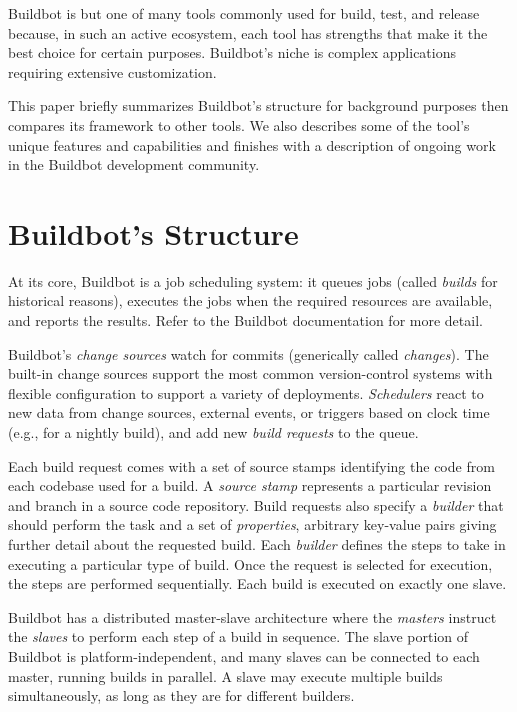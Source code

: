 \documentclass[conference]{IEEEtran}
\begin{document}
Buildbot is but one of many tools commonly used for build, test, and release because, in such an active ecosystem, each tool has strengths that make it the best choice for certain purposes.
Buildbot's niche is complex applications requiring extensive customization.

This paper briefly summarizes Buildbot's structure for background purposes then compares its framework to other tools.
We also describes some of the tool's unique features and capabilities and finishes with a description of ongoing work in the Buildbot development community.

\section{Buildbot's Structure}

At its core, Buildbot is a job scheduling system: it queues jobs (called \emph{builds} for historical reasons), executes the jobs when the required resources are available, and reports the results.
Refer to the Buildbot documentation\cite{bb-introduction} for more detail.

Buildbot's \emph{change sources} watch for commits (generically called \emph{changes}).
The built-in change sources support the most common version-control systems with flexible configuration to support a variety of deployments.
\emph{Schedulers} react to new data from change sources, external events, or triggers based on clock time (e.g., for a nightly build), and add new \emph{build requests} to the queue.

Each build request comes with a set of source stamps identifying the code from each codebase used for a build.
A \emph{source stamp} represents a particular revision and branch in a source code repository.
Build requests also specify a \emph{builder} that should perform the task and a set of \emph{properties}, arbitrary key-value pairs giving further detail about the requested build.
Each \emph{builder} defines the steps to take in executing a particular type of build.
Once the request is selected for execution, the steps are performed sequentially.
Each build is executed on exactly one slave.

Buildbot has a distributed master-slave architecture where the \emph{masters} instruct the \emph{slaves} to perform each step of a build in sequence.
The slave portion of Buildbot is platform-independent, and many slaves can be connected to each master, running builds in parallel.
A slave may execute multiple builds simultaneously, as long as they are for different builders.
\end{document}
